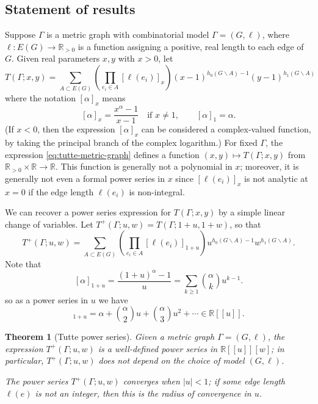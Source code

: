 \documentclass{amsart}
\newtheorem{thm}{Theorem}
\theoremstyle{definition}
\newcommand{\RR}{\mathbb{R}}
\newcommand{\ZZ}{\mathbb{Z}}
\begin{document}
\subsection{Statement of results}
Suppose $\Gamma$ is a metric graph with combinatorial model $\Gamma = (G,\ell)$,
where $\ell : E(G) \to \RR_{>0}$ is a function assigning a positive, real 
 length to each edge of $G$.
Given real parameters $x,y$ with $x > 0$,
let 
\begin{equation}
\label{eq:tutte-metric-graph}
T(\Gamma; x,y) = \sum_{A \subset E(G)} \left( \prod_{e_i \in A} [\ell(e_i)]_{x} \right)
(x-1)^{h_0(G\backslash A) - 1}(y-1)^{h_1(G\backslash A)}
\end{equation}
where the notation $[\alpha]_x$ means
\begin{equation*}
\label{eq:q-analog-real}
[\alpha]_x = \frac{x^\alpha - 1}{x-1}
\quad\text{if } x \neq 1,
\qquad 
[\alpha]_1 = \alpha.
\end{equation*}
(If $x < 0$, then the expression $[\alpha]_x$ can be considered a complex-valued function,
by taking the principal branch of the complex logarithm.)
For fixed $\Gamma$,
the expression \eqref{eq:tutte-metric-graph} defines a function
$(x,y) \mapsto T(\Gamma; x,y)$ from $\RR_{>0}\times \RR \to \RR$.
This function is generally not a polynomial in $x$; %
moreover,  it is generally not even a formal power series in $x$ since
$[\ell(e_i)]_x$ is not analytic at $x = 0$ if the edge length $\ell(e_i)$ is non-integral.

We can recover a power series expression for $T(\Gamma; x,y)$ by a simple linear change of variables.
Let
$T^+(\Gamma; u,w) = T(\Gamma; 1 + u, 1 + w) $,
so that
\begin{equation}
T^+(\Gamma; u,w) = \sum_{A \subset E(G)} \left( \prod_{e_i \in A} [\ell(e_i)]_{1+u} \right)
u^{h_0(G\backslash A) - 1}w^{h_1(G\backslash A)} .
\end{equation}
Note that
\[ [\alpha]_{1+u} = \frac{(1+u)^\alpha - 1}{u}
= \sum_{k \geq 1} \binom{\alpha}{k}u^{k-1} .
\]
so as a power series in $u$ we have 
\begin{equation}
[\alpha]_{1+u} = \alpha + \binom{\alpha}{2} u + \binom{\alpha}{3} u^2 + \cdots
\in \RR[[u]] .
\end{equation}


\begin{thm}[Tutte power series]
Given a metric graph $\Gamma = (G,\ell)$,
the expression $T^+(\Gamma; u,w)$
is a well-defined power series in
$\RR[[u]][w]$;
in particular,
$T^+(\Gamma; u,w)$ does not depend on the choice of model $(G,\ell)$.

The power series $T^+(\Gamma;u,w)$ converges when $|u|<1$;
if some edge length $\ell(e)$ is not an integer,
then this is the radius of convergence in $u$.
\end{thm}
\end{document}
